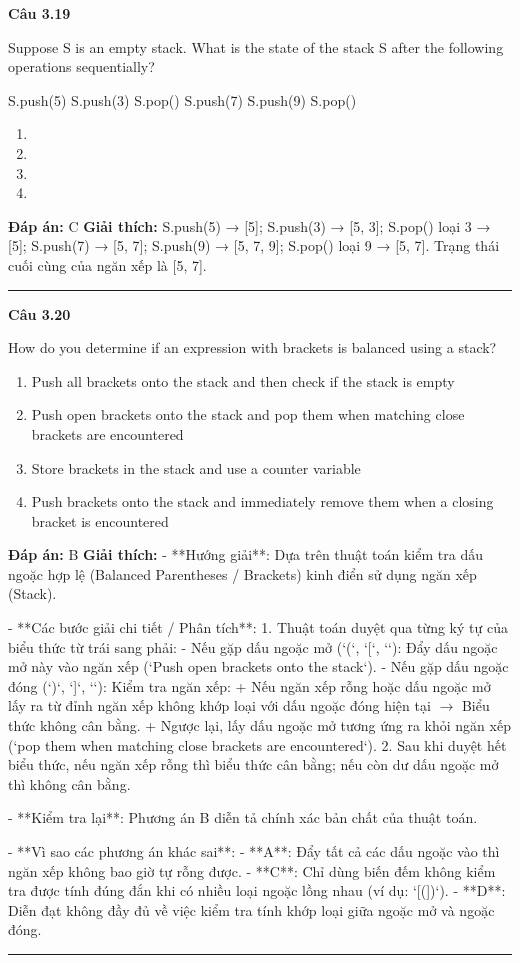 \documentclass[11pt,a4paper]{article}
\newenvironment{question}[1]{%
  \par\vspace{1em}\noindent\textbf{\large Câu #1}\par\vspace{0.4em}
}{%
  \par\vspace{1em}\hrule\vspace{0.6em}
}
\newenvironment{choices}{%
  \begin{enumerate}[label=\textbf{\Alph*.},leftmargin=2.2em,itemsep=2pt,topsep=3pt]
}{%
  \end{enumerate}
}
\newcommand{\choice}{\item}
\newenvironment{codebox}{%
  \begin{tcolorbox}[colback=gray!8!white,colframe=gray!50!black,arc=1.5mm,boxrule=0.6pt,left=3mm,right=3mm,top=2.5mm,bottom=2.5mm]
  \ttfamily\small
}{%
  \end{tcolorbox}
}
\begin{document}
\begin{question}{3.19}
Suppose S is an empty stack. What is the state of the stack S after the following operations sequentially?
\begin{codebox}
S.push(5)
S.push(3)
S.pop()
S.push(7)
S.push(9)
S.pop()
\end{codebox}
\begin{choices}
\choice [5, 3, 7]
\choice [7, 9]
\choice [5, 7]
\choice [7]
\end{choices}
\textbf{Đáp án:} C
\textbf{Giải thích:} S.push(5) → [5]; S.push(3) → [5, 3]; S.pop() loại 3 → [5]; S.push(7) → [5, 7]; S.push(9) → [5, 7, 9]; S.pop() loại 9 → [5, 7]. Trạng thái cuối cùng của ngăn xếp là [5, 7].
\end{question}

\begin{question}{3.20}
How do you determine if an expression with brackets is balanced using a stack?
\begin{choices}
\choice Push all brackets onto the stack and then check if the stack is empty
\choice Push open brackets onto the stack and pop them when matching close brackets are encountered
\choice Store brackets in the stack and use a counter variable
\choice Push brackets onto the stack and immediately remove them when a closing bracket is encountered
\end{choices}
\textbf{Đáp án:} B
\textbf{Giải thích:} - **Hướng giải**:
  Dựa trên thuật toán kiểm tra dấu ngoặc hợp lệ (Balanced Parentheses / Brackets) kinh điển sử dụng ngăn xếp (Stack).

- **Các bước giải chi tiết / Phân tích**:
  1. Thuật toán duyệt qua từng ký tự của biểu thức từ trái sang phải:
     - Nếu gặp dấu ngoặc mở (`(`, `[`, `{`): Đẩy dấu ngoặc mở này vào ngăn xếp (`Push open brackets onto the stack`).
     - Nếu gặp dấu ngoặc đóng (`)`, `]`, `}`): Kiểm tra ngăn xếp:
       + Nếu ngăn xếp rỗng hoặc dấu ngoặc mở lấy ra từ đỉnh ngăn xếp không khớp loại với dấu ngoặc đóng hiện tại \(\rightarrow\) Biểu thức không cân bằng.
       + Ngược lại, lấy dấu ngoặc mở tương ứng ra khỏi ngăn xếp (`pop them when matching close brackets are encountered`).
  2. Sau khi duyệt hết biểu thức, nếu ngăn xếp rỗng thì biểu thức cân bằng; nếu còn dư dấu ngoặc mở thì không cân bằng.

- **Kiểm tra lại**:
  Phương án B diễn tả chính xác bản chất của thuật toán.

- **Vì sao các phương án khác sai**:
  - **A**: Đẩy tất cả các dấu ngoặc vào thì ngăn xếp không bao giờ tự rỗng được.
  - **C**: Chỉ dùng biến đếm không kiểm tra được tính đúng đắn khi có nhiều loại ngoặc lồng nhau (ví dụ: `[(])`).
  - **D**: Diễn đạt không đầy đủ về việc kiểm tra tính khớp loại giữa ngoặc mở và ngoặc đóng.
\end{question}
\end{document}
